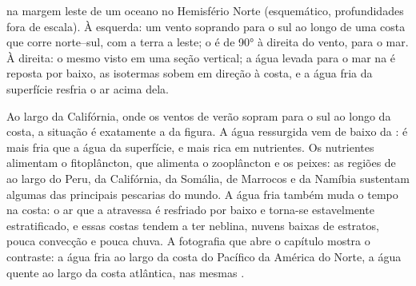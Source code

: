 \begin{omfigure}

{\small {} na margem leste de um oceano no Hemisfério Norte
(esquemático, profundidades fora de escala). À esquerda: um vento soprando para o sul
ao longo de uma costa que corre norte--sul, com a terra a leste; o  é de \ang{90} à direita do vento, para o mar. À direita: o mesmo visto em uma
seção vertical; a água levada para o mar na  é reposta por baixo,
as isotermas sobem em direção à costa, e a água fria da superfície resfria o ar
acima dela.}
\label{fig:b1:ocean-circulation:upwelling}
\end{omfigure}

Ao largo da Califórnia, onde os ventos de verão sopram para o sul ao longo da costa,
a situação é exatamente a da figura. A água ressurgida
vem de baixo da : é mais fria que a água da superfície, e
mais rica em nutrientes. Os nutrientes alimentam o fitoplâncton, que alimenta o
zooplâncton e os peixes: as regiões de  ao largo do Peru, da Califórnia, da Somália,
de Marrocos e da Namíbia sustentam algumas das principais pescarias do mundo. A água fria também
muda o tempo na costa: o ar que a atravessa é resfriado por baixo e
torna-se estavelmente estratificado, e essas costas tendem a ter neblina, nuvens
baixas de estratos, pouca convecção e pouca chuva. A fotografia que abre o capítulo mostra o
contraste: a água fria ao largo da costa do Pacífico da América do Norte, a água quente ao largo da
costa atlântica, nas mesmas .

